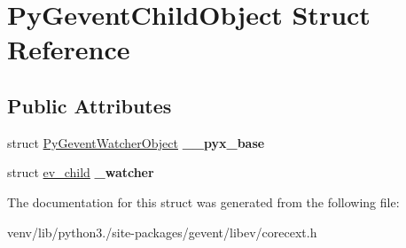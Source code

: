 \hypertarget{struct_py_gevent_child_object}{}\section{Py\+Gevent\+Child\+Object Struct Reference}
\label{struct_py_gevent_child_object}
\subsection*{Public Attributes}
\begin{DoxyCompactItemize}
\item 
\mbox{\label{struct_py_gevent_child_object_a939feea864bc91b619363c8273c7661b}} 
struct \hyperlink{struct_py_gevent_watcher_object}{Py\+Gevent\+Watcher\+Object} {\bfseries \+\_\+\+\_\+pyx\+\_\+base}
\item 
\mbox{\label{struct_py_gevent_child_object_aefd545beaa2bbcf2c944199c1a6962b7}} 
struct \hyperlink{structev__child}{ev\+\_\+child} {\bfseries \+\_\+watcher}
\end{DoxyCompactItemize}


The documentation for this struct was generated from the following file\+:\begin{DoxyCompactItemize}
\item 
venv/lib/python3./site-\/packages/gevent/libev/corecext.\+h\end{DoxyCompactItemize}
